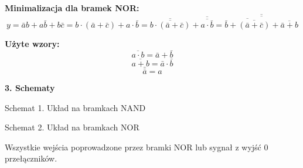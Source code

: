 \documentclass[12pt,a4paper]{report}
\begin{document}
	{\bfseries Minimalizacja dla bramek NOR:}
	\begin{displaymath}
	y=\bar{a}b+a\bar{b}+b\bar{c}
	=b\cdot(\bar{a}+\bar{c})+a\cdot\bar{b}
	=\overline{\overline{b\cdot(\bar{a}+\bar{c})}}+\overline{\overline{a\cdot\bar{b}}}
	=\overline{\overline{\overline{\bar{b}+\overline{(\bar{a}+\bar{c})}}+\overline{\bar{a}+b}}}
	\end{displaymath}
	
	
	{\bfseries Użyte wzory:}
	\begin{equation}
	\overline{a\cdot b}=\bar{a}+\bar{b}
	\end{equation}
	\pagebreak
	\begin{equation}
	\overline{a+b}=\bar{a}\cdot\bar{b}
	\end{equation}
	\begin{equation}
	\bar{\bar{a}}=a
	\end{equation}
	
	\vspace{0.5cm}
	{\large\bfseries 3. Schematy}
	
	\vspace{0.5cm}
	\begin{center}
		Schemat 1. Układ na bramkach NAND
	\end{center}
	
	\vspace{1.0cm}
	\begin{center}
		Schemat 2. Układ na bramkach NOR
	\end{center}
	Wszystkie wejścia poprowadzone przez bramki NOR lub sygnał z wyjść 0 przełączników.\\ 
	
\end{document}
